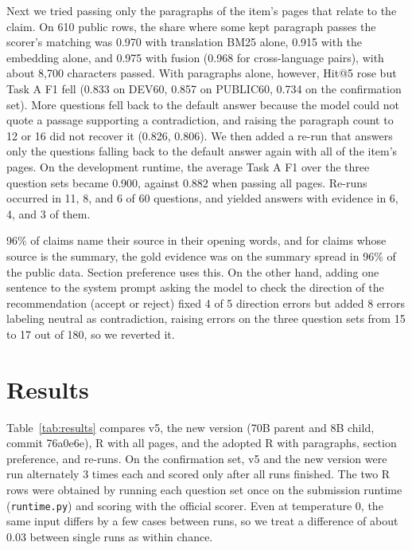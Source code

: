 \documentclass[10pt,a4paper]{article}
\begin{document}
Next we tried passing only the paragraphs of the item's pages that relate to the claim.
On 610 public rows, the share where some kept paragraph passes the scorer's matching was 0.970 with translation BM25 alone, 0.915 with the embedding alone, and 0.975 with fusion (0.968 for cross-language pairs), with about 8,700 characters passed.
With paragraphs alone, however, Hit@5 rose but Task A F1 fell (0.833 on DEV60, 0.857 on PUBLIC60, 0.734 on the confirmation set). More questions fell back to the default answer because the model could not quote a passage supporting a contradiction, and raising the paragraph count to 12 or 16 did not recover it (0.826, 0.806).
We then added a re-run that answers only the questions falling back to the default answer again with all of the item's pages. On the development runtime, the average Task A F1 over the three question sets became 0.900, against 0.882 when passing all pages. Re-runs occurred in 11, 8, and 6 of 60 questions, and yielded answers with evidence in 6, 4, and 3 of them.

96\% of claims name their source in their opening words, and for claims whose source is the summary, the gold evidence was on the summary spread in 96\% of the public data. Section preference uses this.
On the other hand, adding one sentence to the system prompt asking the model to check the direction of the recommendation (accept or reject) fixed 4 of 5 direction errors but added 8 errors labeling neutral as contradiction, raising errors on the three question sets from 15 to 17 out of 180, so we reverted it.

\section{Results}

Table~\ref{tab:results} compares v5, the new version (70B parent and 8B child, commit 76a0e6e), R with all pages, and the adopted R with paragraphs, section preference, and re-runs.
On the confirmation set, v5 and the new version were run alternately 3 times each and scored only after all runs finished. The two R rows were obtained by running each question set once on the submission runtime (\texttt{runtime.py}) and scoring with the official scorer.
Even at temperature 0, the same input differs by a few cases between runs, so we treat a difference of about 0.03 between single runs as within chance.
\end{document}
